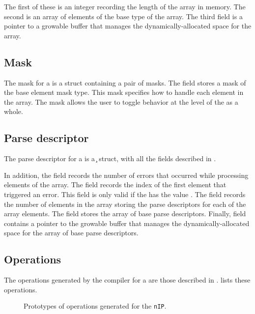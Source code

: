 %
\noindent
The first of these is an integer recording the length of the
array in memory.  The second is an array of elements of the base type
of the array.  The third field is a pointer to a growable buffer that
manages the dynamically-allocated space for the array.


\subsection{Mask}
\label{sec:arrays-masks}
The mask for a \Parray{} is a struct containing a pair of masks.  The
 field stores a mask of the base element mask type.  This
mask specifies how to handle each element in the array.  The
 mask allows the user to toggle behavior at the level
of the \Parray{} as a whole. 



\subsection{Parse descriptor}
\label{sec:arrays-parse-descriptors}
The parse descriptor for a \Parray{} is a \c{} struct, with all the
fields described in .  

%
\noindent
In addition, the field  records the number of errors that
occurred while processing elements of the array. The field
 records the index of the first element that triggered
an error.  This field is only valid if the  has the value
.  The  field records the number of
elements in the array storing the parse descriptors for each of the
array elements.  The field  stores the array of base parse
descriptors.  Finally, field  contains a pointer to the
growable buffer that manages the dynamically-allocated space for the
array of base parse descriptors.

\subsection{Operations}
The operations generated by the \pads{} compiler for a \Parray{} are
those described in .
 lists these operations.
\begin{figure}
\caption{Prototypes of operations generated for
  the \Parray{} \texttt{nIP}.}
\label{figure:array-ops}
\end{figure}

